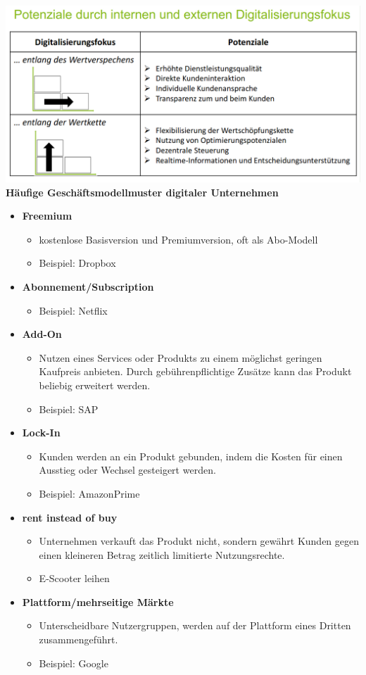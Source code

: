 \documentclass[a4]{scrartcl}
\begin{document}
\includegraphics[scale=0.3]{potdig.png}
\\

\textbf{Häufige Geschäftsmodellmuster digitaler Unternehmen}

\begin{itemize}
\item \textbf{Freemium}
\begin{itemize}
\item kostenlose Basisversion und Premiumversion, oft als Abo-Modell
\item Beispiel: Dropbox
\end{itemize}
\item \textbf{Abonnement/Subscription}
\begin{itemize}
\item Beispiel: Netflix
\end{itemize}
\item \textbf{Add-On}
\begin{itemize}
\item Nutzen eines Services oder Produkts zu einem möglichst geringen Kaufpreis anbieten. Durch gebührenpflichtige Zusätze kann das Produkt beliebig erweitert werden. 
\item Beispiel: SAP
\end{itemize}
\item \textbf{Lock-In}
\begin{itemize}
\item Kunden werden an ein Produkt gebunden, indem die Kosten für einen Ausstieg oder Wechsel gesteigert werden.
\item Beispiel: AmazonPrime
\end{itemize}
\item \textbf{rent instead of buy}
\begin{itemize}
\item Unternehmen verkauft das Produkt nicht, sondern gewährt Kunden gegen einen kleineren Betrag zeitlich limitierte Nutzungsrechte.
\item E-Scooter leihen
\end{itemize}
\item \textbf{Plattform/mehrseitige Märkte}
\begin{itemize}
\item Unterscheidbare Nutzergruppen, werden auf der Plattform eines Dritten zusammengeführt.
\item Beispiel: Google
\end{itemize}
\end{itemize}
\end{document}
